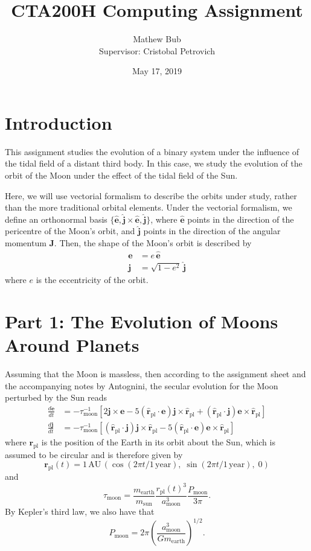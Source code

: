 \documentclass[11pt]{article}
\title{CTA200H Computing Assignment}
\author{Mathew Bub \\ Supervisor: Cristobal Petrovich}
\date{May 17, 2019}
\newcommand{\evec}{\mathbf{e}}
\newcommand{\ehat}{\hat{\evec}}
\newcommand{\jvec}{\mathbf{j}}
\newcommand{\jhat}{\hat{\jvec}}
\newcommand{\Jvec}{\mathbf{J}}
\newcommand{\rpl}{\mathbf{r_{\mathrm{pl}}}}
\newcommand{\rplhat}{\mathbf{\hat{r}_{\mathrm{pl}}}}
\begin{document}
\maketitle

\section*{Introduction}
This assignment studies the evolution of a binary system under the influence of the tidal field of a distant third body. In this case, we study the evolution of the orbit of the Moon under the effect of the tidal field of the Sun.

Here, we will use vectorial formalism \parencite{tremaine2014} to describe the orbits under study, rather than the more traditional orbital elements. Under the vectorial formalism, we define an orthonormal basis $\{\ehat, \jhat \times \ehat, \jhat\}$, where $\ehat$ points in the direction of the pericentre of the Moon's orbit, and $\jhat$ points in the direction of the angular momentum $\Jvec$. Then, the shape of the Moon's orbit is described by
\begin{align}
    \evec &= e \, \ehat \label{eq:evec} \\
    \jvec &= \sqrt{1-e^2} \, \jhat \label{eq:jvec}
\end{align}
where $e$ is the eccentricity of the orbit. 

\section*{Part 1: The Evolution of Moons Around Planets}
Assuming that the Moon is massless, then according to the assignment sheet and the accompanying notes by Antognini, the secular evolution for the Moon perturbed by the Sun reads
\begin{align}
    \frac{d\evec}{dt} &= -\tau_{\mathrm{moon}}^{-1}[2 \jvec \times \evec - 5(\rplhat \cdot \evec) \jvec \times \rplhat + (\rplhat \cdot \jvec) \evec \times \rplhat] \label{eq:devec} \\
    \frac{d\jvec}{dt} &= -\tau_{\mathrm{moon}}^{-1}[(\rplhat \cdot \jvec) \jvec \times \rplhat - 5(\rplhat \cdot \evec) \evec \times \rplhat] \label{eq:djvec}
\end{align}
where $\rpl$ is the position of the Earth in its orbit about the Sun, which is assumed to be circular and is therefore given by
\begin{equation} \label{eq:rpl}
    \rpl(t) = 1 \, \mathrm{AU} \, (\cos(2 \pi t/1 \, \mathrm{year}), \; \sin(2 \pi t/1 \, \mathrm{year}), \; 0)
\end{equation}
and
\begin{equation} \label{eq:tau}
    \tau_{\mathrm{moon}} = \frac{m_{\mathrm{earth}}}{m_{\mathrm{sun}}} \frac{r_{\mathrm{pl}}(t)^3}{a_{\mathrm{moon}}^3} \frac{P_{\mathrm{moon}}}{3 \pi}.
\end{equation}
By Kepler's third law, we also have that
\begin{equation} \label{eq:Pmoon}
    P_{\mathrm{moon}} = 2\pi \left( \frac{a_{\mathrm{moon}}^3}{Gm_{\mathrm{earth}}} \right)^{1/2}.
\end{equation}
\end{document}

